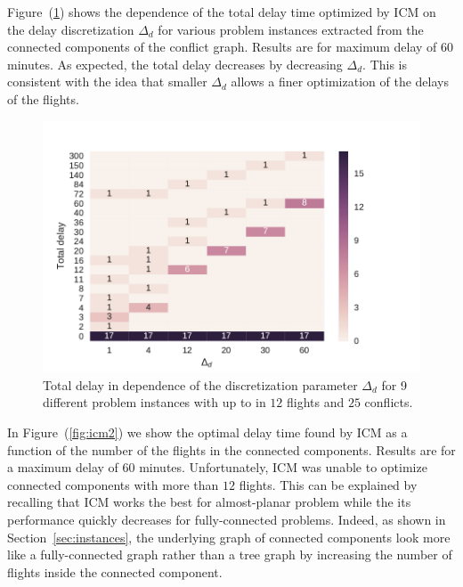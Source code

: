 Figure~(\ref{fig:icm1}) shows the dependence of the total delay time optimized by ICM on the delay discretization $\Delta_d$ for various problem instances extracted from the connected components of the conflict graph.
Results are for maximum delay of 60 minutes. 
As expected, the total delay decreases by decreasing $\Delta_d$.
This is consistent with the idea that smaller $\Delta_d$ allows a finer optimization of the delays of the flights.


\begin{figure}
  \includegraphics[width=\columnwidth]{pics/qubo_icm/qubo_icm_3.pdf}
  \caption{Total delay in dependence of the discretization parameter $\Delta_d$ for 9 different problem instances with up to in $12$ flights and $25$ conflicts.}
\label{fig:icm1}
\end{figure}

In Figure~(\ref{fig:icm2}) we show the optimal delay time found by ICM as a
function of the number of the flights in the connected components. Results are
for a maximum delay of 60 minutes. Unfortunately, ICM was unable to optimize
connected components with more than $12$ flights. This can be explained by
recalling that ICM works the best for almost-planar problem while the
its performance quickly decreases for fully-connected problems. Indeed, as shown
in Section~\ref{sec:instances}, the underlying graph of connected components
look more like a fully-connected graph rather than a tree graph by increasing
the number of flights inside the connected component.

